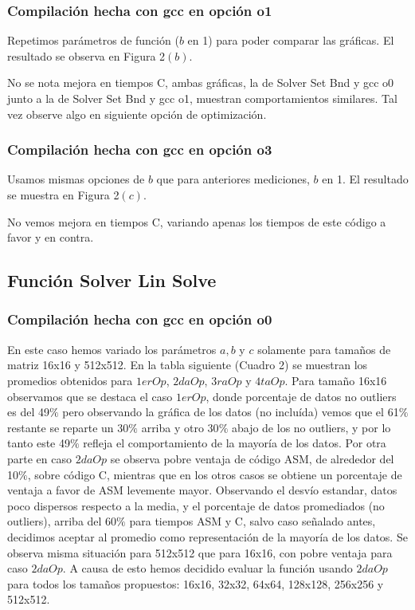 \subsubsection{Compilación hecha con gcc en opción o1}
Repetimos parámetros de función ($b$ en 1) para poder comparar las gráficas. El resultado se observa en Figura 2$(b)$.
 
No se nota mejora en tiempos C, ambas gráficas, la de Solver Set Bnd y gcc o0 junto a la de Solver Set Bnd y gcc o1, muestran comportamientos similares. Tal vez observe algo en siguiente opción de optimización.

\subsubsection{Compilación hecha con gcc en opción o3}
Usamos mismas opciones de $b$ que para anteriores mediciones, $b$ en 1. El resultado se muestra en Figura 2$(c)$.
 
No vemos mejora en tiempos C, variando apenas los tiempos de este código a favor y en contra. 

\subsection{Función Solver Lin Solve}

\subsubsection{Compilación hecha con gcc en opción o0}
En este caso hemos variado los parámetros $a,b$ y $c$ solamente para tamaños de matriz 16x16 y 512x512. En la tabla siguiente (Cuadro 2) se muestran los promedios obtenidos para $1erOp$, $2daOp$, $3raOp$ y $4taOp$. 
Para tamaño 16x16 observamos que se destaca el caso $1erOp$, donde porcentaje de datos no outliers es del 49$\%$ pero observando la gráfica de los datos (no incluída) vemos que el 61$\%$ restante se reparte un 30$\%$ arriba y otro 30$\%$ abajo de los no outliers, y por lo tanto este 49$\%$ refleja el comportamiento de la mayoría de los datos. Por otra parte en caso $2daOp$ se observa pobre ventaja de código ASM, de alrededor del 10$\%$, sobre código C, mientras que en los otros casos se obtiene un porcentaje de ventaja a favor de ASM levemente mayor. Observando el desvío estandar, datos poco dispersos respecto a la media, y el porcentaje de datos promediados (no outliers), arriba del 60$\%$ para tiempos ASM y C, salvo caso señalado antes, decidimos aceptar al promedio como representación de la mayoría de los datos. Se observa misma situación para 512x512 que para 16x16, con pobre ventaja para caso $2daOp$. A causa de esto hemos decidido evaluar la función usando $2daOp$ para todos los tamaños propuestos: 16x16, 32x32, 64x64, 128x128, 256x256 y 512x512.
  
